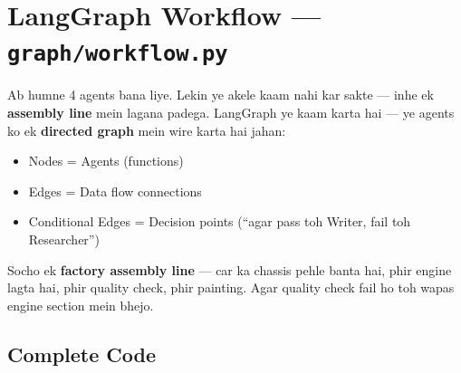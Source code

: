 \documentclass[12pt, a4paper]{article}
\begin{document}
\newpage
\section{LangGraph Workflow --- \texttt{graph/workflow.py}}

\begin{storybox}
Ab humne 4 agents bana liye. Lekin ye akele kaam nahi kar sakte --- inhe ek \textbf{assembly line} mein lagana padega. LangGraph ye kaam karta hai --- ye agents ko ek \textbf{directed graph} mein wire karta hai jahan:
\begin{itemize}
\item Nodes = Agents (functions)
\item Edges = Data flow connections
\item Conditional Edges = Decision points (``agar pass toh Writer, fail toh Researcher'')
\end{itemize}
Socho ek \textbf{factory assembly line} --- car ka chassis pehle banta hai, phir engine lagta hai, phir quality check, phir painting. Agar quality check fail ho toh wapas engine section mein bhejo.
\end{storybox}

\subsection{Complete Code}
\end{document}
